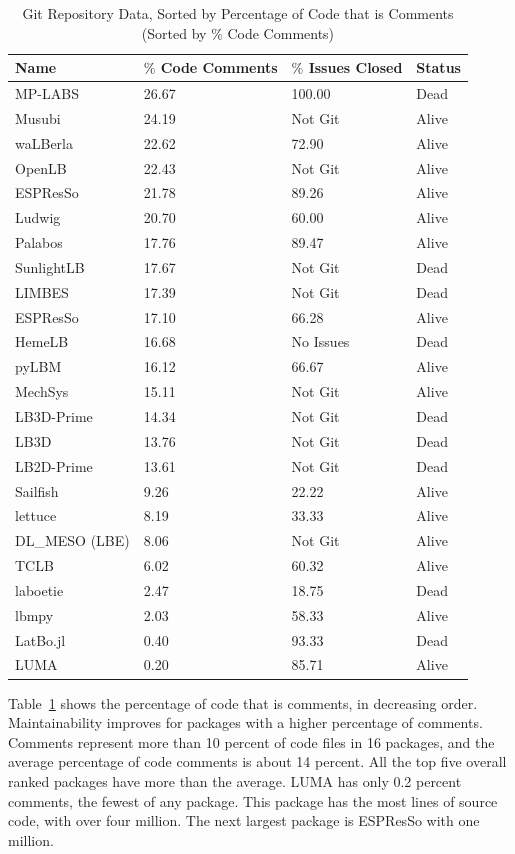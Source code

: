 \documentclass[final, 3p, times, authoryear]{elsarticle}
\newcommand{\esp}{ESPResSo\nolinebreak\hspace{-.05em}\raisebox{.4ex}{\small\bf
+}\nolinebreak\hspace{-.10em}\raisebox{.4ex}{\small\bf +}}
\begin{document}
\begin{table}[ht!]
	\begin{center}
		\begin{tabular}{ p{3.5cm}p{3.5cm}p{3.5cm}p{2.5cm} }
			\toprule
			Name & $\%$ Code Comments & $\%$ Issues Closed & Status\\
			\midrule
			MP-LABS & 26.67 & 100.00 & Dead\\
			Musubi & 24.19 & Not Git & Alive\\
			waLBerla & 22.62 & 72.90 & Alive\\
			OpenLB & 22.43 & Not Git & Alive\\
			ESPResSo & 21.78 & 89.26 & Alive\\
			Ludwig& 20.70 & 60.00 & Alive\\
			Palabos & 17.76 & 89.47 & Alive\\
			SunlightLB & 17.67 & Not Git & Dead\\
			LIMBES & 17.39 & Not Git & Dead\\
			\esp & 17.10 & 66.28 & Alive\\
			HemeLB & 16.68 & No Issues & Dead\\
			pyLBM & 16.12 & 66.67 & Alive\\
			MechSys & 15.11 & Not Git & Alive\\
			LB3D-Prime & 14.34 & Not Git & Dead\\
			LB3D & 13.76 & Not Git & Dead\\
			LB2D-Prime & 13.61 & Not Git & Dead\\
			Sailfish & 9.26 & 22.22 & Alive\\
			lettuce & 8.19 & 33.33 & Alive\\
			DL\_MESO (LBE) & 8.06 & Not Git & Alive\\
			TCLB & 6.02 & 60.32 & Alive\\
			laboetie & 2.47 & 18.75 & Dead\\	
			lbmpy& 2.03 & 58.33 & Alive\\	
			LatBo.jl & 0.40 & 93.33 & Dead\\
			LUMA& 0.20 & 85.71 & Alive\\
			\bottomrule
		\end{tabular}
		\caption{Git Repository Data, Sorted by Percentage of Code that is
			Comments (Sorted by $\%$ Code Comments)} \label{gitrepodata}
	\end{center}
\end{table}
		
Table~\ref{gitrepodata} shows the percentage of code that is comments, in
decreasing order. Maintainability improves for packages with a
higher percentage of comments. Comments represent more than 10 percent of code
files in 16 packages, and the average percentage of code comments is about 14
percent. All the top five overall ranked packages have more than the average.
LUMA has only 0.2 percent comments, the fewest of any package. This package has
the most lines of source code, with over four million. The next largest package
is \esp{} with one million.
\end{document}
